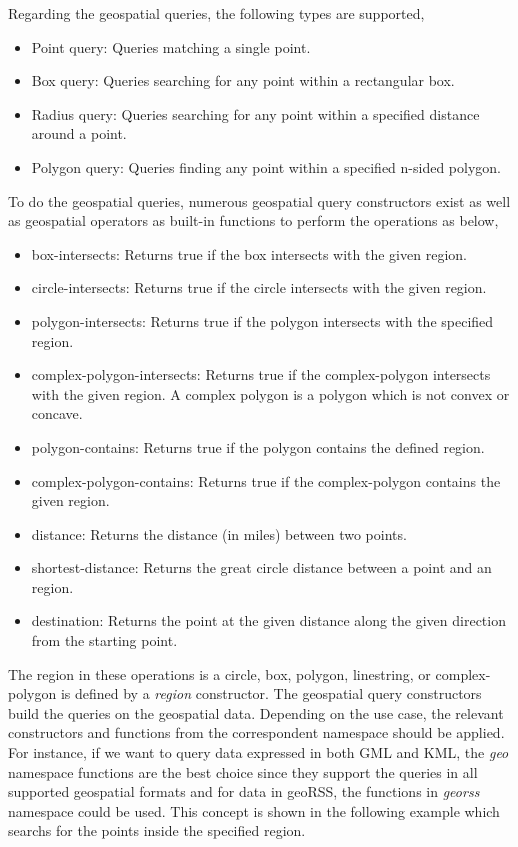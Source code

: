 \documentclass[a4paper,12pt]{article}
\begin{document}
Regarding the geospatial queries, the following types are supported,
\begin{itemize}
\item Point query: Queries matching a single point.
\item Box query: Queries searching for any point within a rectangular box.
\item Radius query: Queries searching for any point within a specified distance around a point.
\item Polygon query: Queries finding any point within a specified n-sided polygon.
\end{itemize}
To do the geospatial queries, numerous geospatial query constructors exist as well as geospatial operators as built-in functions to perform the operations as below,
\begin{itemize}
\item box-intersects: Returns true if the box intersects with the given region.
\item circle-intersects: Returns true if the circle intersects with the given region.
\item polygon-intersects: Returns true if the polygon intersects with the specified region.
\item complex-polygon-intersects: Returns true if the complex-polygon intersects with the given region. A complex polygon is a polygon which is not convex or concave.
\item polygon-contains: Returns true if the polygon contains the defined region.
\item complex-polygon-contains: Returns true if the complex-polygon contains the given region.
\item distance: Returns the distance (in miles) between two points.
\item shortest-distance: Returns the great circle distance between a point and an region. 
\item destination: Returns the point at the given distance along the given direction from the starting point.
\end{itemize}
The region in these operations is a circle, box, polygon, linestring, or complex-polygon is defined by a \textit{region} constructor.
The geospatial query constructors build the queries on the geospatial data. Depending on the use case, the relevant constructors and functions from the correspondent namespace should be applied. For instance, if we want to query data expressed in both GML and KML, the \textit{geo} namespace functions are the best choice since they support the queries in all supported geospatial formats and for data in geoRSS, the functions in \textit{georss} namespace could be used. This concept is shown in the following example which searchs for the points inside the specified region. 
\end{document}
